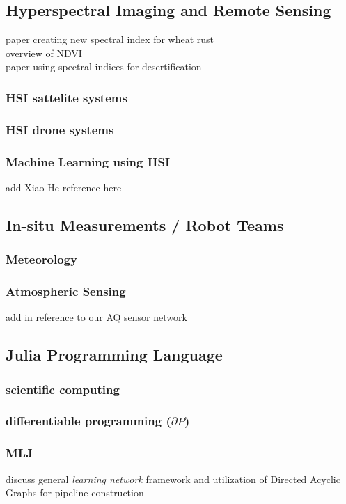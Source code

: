 \subsection{Hyperspectral Imaging and Remote Sensing}
paper creating new spectral index for wheat rust \cite{SpectralIndexWheat} \\ 
overview of NDVI \cite{SpectralIndexNDVI} \\ 
paper using spectral indices for desertification \cite{SpectralIndexDesertification}


\subsubsection{HSI sattelite systems}
\subsubsection{HSI drone systems}
\subsubsection{Machine Learning using HSI}
add Xiao He reference here \cite{yu2021pm2}

\subsection{In-situ Measurements / Robot Teams}
\subsubsection{Meteorology}
\subsubsection{Atmospheric Sensing}
add in reference to our AQ sensor network

\subsection{Julia Programming Language}
\subsubsection{scientific computing}
\subsubsection{differentiable programming ($\partial P$)}
\subsubsection{MLJ}
discuss general \textit{learning network} framework and utilization of
Directed Acyclic Graphs for pipeline construction

